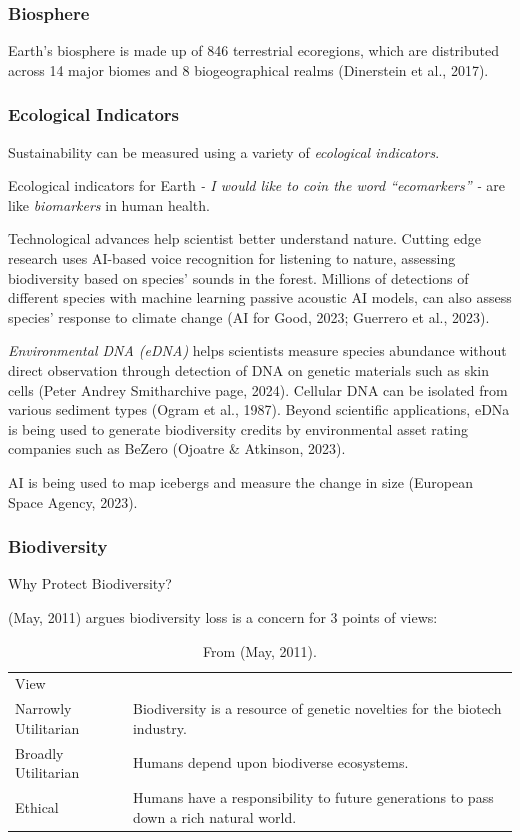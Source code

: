 \documentclass[
  letterpaper,
  DIV=11,
  numbers=noendperiod]{scrartcl}
\begin{document}
\subsubsection{Biosphere}\label{biosphere}

Earth's biosphere is made up of 846 terrestrial ecoregions, which are
distributed across 14 major biomes and 8 biogeographical realms
(Dinerstein et al., 2017).

\subsubsection{Ecological Indicators}\label{ecological-indicators}

Sustainability can be measured using a variety of \emph{ecological
indicators}.

Ecological indicators for Earth \emph{- I would like to coin the word
``ecomarkers'' -} are like \emph{biomarkers} in human health.

Technological advances help scientist better understand nature. Cutting
edge research uses AI-based voice recognition for listening to nature,
assessing biodiversity based on species' sounds in the forest. Millions
of detections of different species with machine learning passive
acoustic AI models, can also assess species' response to climate change
(AI for Good, 2023; Guerrero et al., 2023).

\emph{Environmental DNA (eDNA)} helps scientists measure species
abundance without direct observation through detection of DNA on genetic
materials such as skin cells (Peter Andrey Smitharchive page, 2024).
Cellular DNA can be isolated from various sediment types (Ogram et al.,
1987). Beyond scientific applications, eDNa is being used to generate
biodiversity credits by environmental asset rating companies such as
BeZero (Ojoatre \& Atkinson, 2023).

AI is being used to map icebergs and measure the change in size
(European Space Agency, 2023).

\subsubsection{Biodiversity}\label{biodiversity}

Why Protect Biodiversity?

(May, 2011) argues biodiversity loss is a concern for 3 points of views:

\begin{longtable}[]{@{}
  >{\raggedright\arraybackslash}p{}
  >{\raggedright\arraybackslash}p{}@{}}
\caption{From (May, 2011).}\tabularnewline
\toprule\noalign{}
\endfirsthead
\endhead
\bottomrule\noalign{}
\endlastfoot
View & \\
Narrowly Utilitarian & Biodiversity is a resource of genetic novelties
for the biotech industry. \\
Broadly Utilitarian & Humans depend upon biodiverse ecosystems. \\
Ethical & Humans have a responsibility to future generations to pass
down a rich natural world. \\
\end{longtable}
\end{document}
